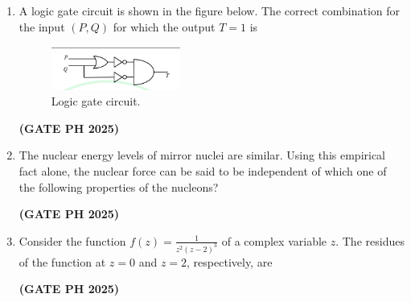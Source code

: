 \documentclass[14pt, a4paper]{extarticle}
\begin{document}
\begin{enumerate}[label=\textbf{Q.\arabic*}]
\item A logic gate circuit is shown in the figure below. The correct combination for the input $(P, Q)$ for which the output $T = 1$ is
\begin{figure}[H]
\centering
\includegraphics[width=0.4\textwidth]{figs/q19fig25.png}
\caption{Logic gate circuit.}
\label{fig:q19_logic_gate}
\end{figure}
\begin{enumerate}
\end{enumerate}
\hfill \textbf{(GATE PH 2025)}

\item The nuclear energy levels of mirror nuclei are similar. Using this empirical fact alone, the nuclear force can be said to be independent of which one of the following properties of the nucleons?
\begin{enumerate}
\end{enumerate}
\hfill \textbf{(GATE PH 2025)}

\item Consider the function $f(z) = \frac{1}{z^2(z-2)^3}$ of a complex variable $z$. The residues of the function at $z=0$ and $z=2$, respectively, are
\begin{enumerate}
\end{enumerate}
\hfill \textbf{(GATE PH 2025)}


\end{enumerate}
\end{document}
